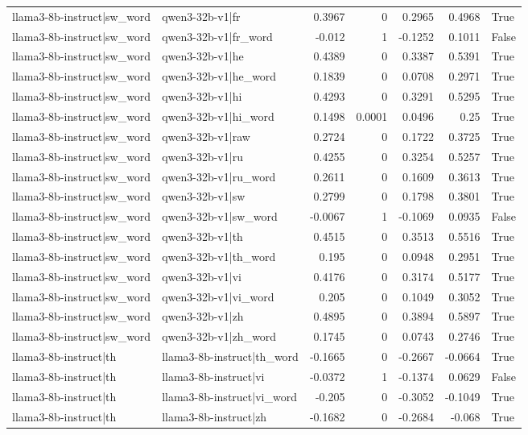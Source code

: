 \begin{table}
\begin{tabular}{l l r r r r l}
llama3-8b-instruct|sw_word & qwen3-32b-v1|fr & 0.3967 & 0 & 0.2965 & 0.4968 & True \\
llama3-8b-instruct|sw_word & qwen3-32b-v1|fr_word & -0.012 & 1 & -0.1252 & 0.1011 & False \\
llama3-8b-instruct|sw_word & qwen3-32b-v1|he & 0.4389 & 0 & 0.3387 & 0.5391 & True \\
llama3-8b-instruct|sw_word & qwen3-32b-v1|he_word & 0.1839 & 0 & 0.0708 & 0.2971 & True \\
llama3-8b-instruct|sw_word & qwen3-32b-v1|hi & 0.4293 & 0 & 0.3291 & 0.5295 & True \\
llama3-8b-instruct|sw_word & qwen3-32b-v1|hi_word & 0.1498 & 0.0001 & 0.0496 & 0.25 & True \\
llama3-8b-instruct|sw_word & qwen3-32b-v1|raw & 0.2724 & 0 & 0.1722 & 0.3725 & True \\
llama3-8b-instruct|sw_word & qwen3-32b-v1|ru & 0.4255 & 0 & 0.3254 & 0.5257 & True \\
llama3-8b-instruct|sw_word & qwen3-32b-v1|ru_word & 0.2611 & 0 & 0.1609 & 0.3613 & True \\
llama3-8b-instruct|sw_word & qwen3-32b-v1|sw & 0.2799 & 0 & 0.1798 & 0.3801 & True \\
llama3-8b-instruct|sw_word & qwen3-32b-v1|sw_word & -0.0067 & 1 & -0.1069 & 0.0935 & False \\
llama3-8b-instruct|sw_word & qwen3-32b-v1|th & 0.4515 & 0 & 0.3513 & 0.5516 & True \\
llama3-8b-instruct|sw_word & qwen3-32b-v1|th_word & 0.195 & 0 & 0.0948 & 0.2951 & True \\
llama3-8b-instruct|sw_word & qwen3-32b-v1|vi & 0.4176 & 0 & 0.3174 & 0.5177 & True \\
llama3-8b-instruct|sw_word & qwen3-32b-v1|vi_word & 0.205 & 0 & 0.1049 & 0.3052 & True \\
llama3-8b-instruct|sw_word & qwen3-32b-v1|zh & 0.4895 & 0 & 0.3894 & 0.5897 & True \\
llama3-8b-instruct|sw_word & qwen3-32b-v1|zh_word & 0.1745 & 0 & 0.0743 & 0.2746 & True \\
llama3-8b-instruct|th & llama3-8b-instruct|th_word & -0.1665 & 0 & -0.2667 & -0.0664 & True \\
llama3-8b-instruct|th & llama3-8b-instruct|vi & -0.0372 & 1 & -0.1374 & 0.0629 & False \\
llama3-8b-instruct|th & llama3-8b-instruct|vi_word & -0.205 & 0 & -0.3052 & -0.1049 & True \\
llama3-8b-instruct|th & llama3-8b-instruct|zh & -0.1682 & 0 & -0.2684 & -0.068 & True \\

\end{tabular}
\end{table}
